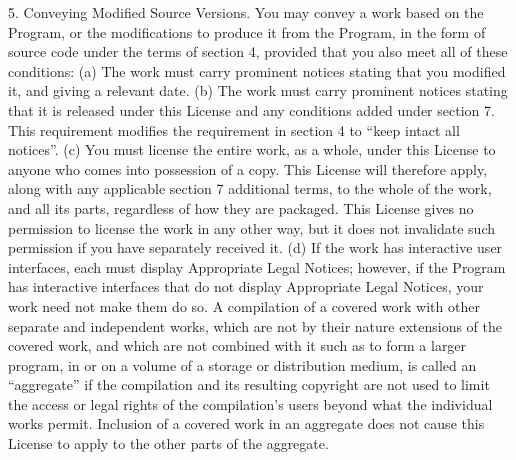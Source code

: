 \documentclass {book}
\begin{document}
\begin{tiny}
5. Conveying Modified Source Versions. You may convey a work based on the Program, or the modifications to produce it from the Program, in the form of source code under the terms of section 4, provided that you also meet all of these conditions: (a) The work must carry prominent notices stating that you modified it, and giving a relevant date. (b) The work must carry prominent notices stating that it is released under this License and any conditions added under section 7. This requirement modifies the requirement in section 4 to ``keep intact all notices''. (c) You must license the entire work, as a whole, under this License to anyone who comes into possession of a copy. This License will therefore apply, along with any applicable section 7 additional terms, to the whole of the work, and all its parts, regardless of how they are packaged. This License gives no permission to license the work in any other way, but it does not invalidate such permission if you have separately received it. (d) If the work has interactive user interfaces, each must display Appropriate Legal Notices; however, if the Program has interactive interfaces that do not display Appropriate Legal Notices, your work need not make them do so. A compilation of a covered work with other separate and independent works, which are not by their nature extensions of the covered work, and which are not combined with it such as to form a larger program, in or on a volume of a storage or distribution medium, is called an ``aggregate'' if the compilation and its resulting copyright are not used to limit the access or legal rights of the compilation's users beyond what the individual works permit. Inclusion of a covered work in an aggregate does not cause this License to apply to the other parts of the aggregate.


\end{tiny}
\end{document}
